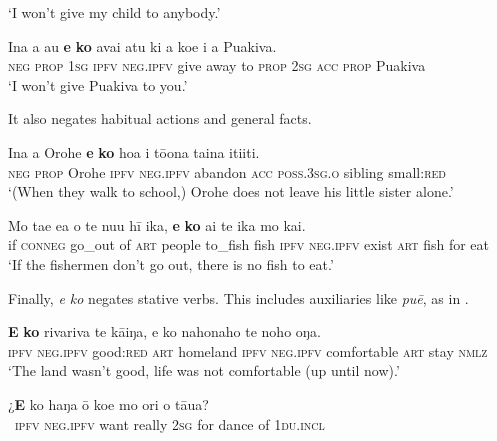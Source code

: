 \glt 
‘I won’t give my child to anybody.’ \textstyleExampleref{[R229.069]} 
\z

\ea\label{ex:10.127}
\gll {\ꞌ}Ina a au \textbf{e} \textbf{ko} {\ꞌ}avai atu ki a koe i a Puakiva. \\
\textsc{neg} \textsc{prop} \textsc{1sg} \textsc{ipfv} \textsc{neg.ipfv} give away to \textsc{prop} \textsc{2sg} \textsc{acc} \textsc{prop} Puakiva \\

\glt
‘I won’t give Puakiva to you.’ \textstyleExampleref{[R229.010]} 
\z

It also negates habitual actions and general facts.

\ea\label{ex:10.128}
\gll {\ꞌ}Ina a {\ꞌ}Orohe \textbf{e} \textbf{ko} hoa i tō{\ꞌ}ona taina {\ꞌ}iti{\ꞌ}iti. \\
\textsc{neg} \textsc{prop} Orohe \textsc{ipfv} \textsc{neg.ipfv} abandon \textsc{acc} \textsc{poss.3sg.o} sibling small:\textsc{red} \\

\glt 
‘(When they walk to school,) Orohe does not leave his little sister alone.’ \textstyleExampleref{[R166.005]} 
\z

\ea\label{ex:10.129}
\gll Mo ta{\ꞌ}e e{\ꞌ}a o te nu{\ꞌ}u hī ika, \textbf{e} \textbf{ko} ai te ika mo kai. \\
if \textsc{conneg} go\_out of \textsc{art} people to\_fish fish \textsc{ipfv} \textsc{neg.ipfv} exist \textsc{art} fish for eat \\

\glt
‘If the fishermen don’t go out, there is no fish to eat.’ \textstyleExampleref{[R334.261]} 
\z

Finally, \textit{e ko} negates stative verbs. This includes auxiliaries like \textit{puē}, as in .

\ea\label{ex:10.130}
\gll \textbf{E} \textbf{ko} rivariva te kāiŋa, e ko nahonaho te noho oŋa. \\
\textsc{ipfv} \textsc{neg.ipfv} good:\textsc{red} \textsc{art} homeland \textsc{ipfv} \textsc{neg.ipfv} comfortable \textsc{art} stay \textsc{nmlz} \\

\glt 
‘The land wasn’t good, life was not comfortable (up until now).’ \textstyleExampleref{[R368.103]} 
\z

\ea\label{ex:10.131}
\gll ¿\textbf{E} ko haŋa {\ꞌ}ō koe mo {\ꞌ}ori o tāua? \\
~\textsc{ipfv} \textsc{neg.ipfv} want really \textsc{2sg} for dance of \textsc{1du.incl} \\

